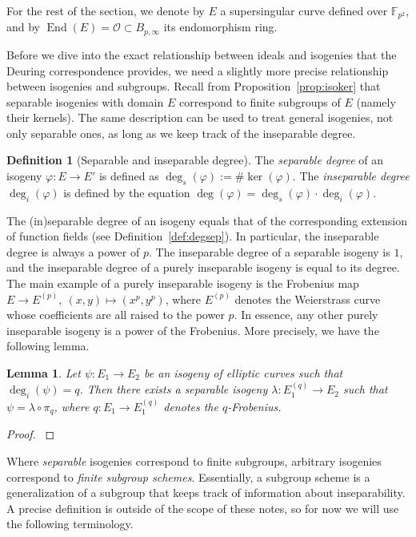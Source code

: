 \documentclass[10pt]{article}
\theoremstyle{plain}
\newtheorem{lemma}[theorem]{Lemma}
\theoremstyle{definition}
\newtheorem{definition}[theorem]{Definition}
\DeclareMathOperator{\End}{End} %
\def\F{\ensuremath{\mathbb{F}}}
\def\O{\ensuremath{\mathcal{O}}}
\begin{document}
For the rest of the section, we denote by $E$ a supersingular curve
defined over $\F_{p^2}$, and by $\End(E)=\O\subset B_{p,\infty}$ its
endomorphism ring.

Before we dive into the exact relationship between ideals and isogenies
that the Deuring correspondence provides, we need a slightly more
precise relationship between isogenies and subgroups.
Recall from Proposition~\ref{prop:isoker} that separable isogenies
with domain $E$ correspond to finite subgroups of $E$ (namely their kernels).
The same description can be used to treat general isogenies, not only
separable ones, as long as we keep track of the inseparable degree.

\begin{definition}[Separable and inseparable degree]
The \emph{separable degree} of an isogeny $\varphi:E\to E'$ is defined as
$\deg_s(\varphi):= \#\ker(\varphi)$.
The \emph{inseparable degree} $\deg_i(\varphi)$ is defined
by the equation
$\deg(\varphi) = \deg_s(\varphi) \cdot \deg_i(\varphi)$.
\end{definition}

The (in)separable degree of an isogeny equals that of 
the corresponding extension of function fields
(see Definition~\ref{def:degsep}).
In particular, the inseparable degree is always a power of $p$.
The inseparable degree of a separable isogeny is $1$,
and the inseparable degree of a purely inseparable isogeny is equal
to its degree.
The main example of a purely inseparable isogeny is the Frobenius map
$E\to E^{(p)},\:(x,y)\mapsto (x^p,y^p)$, where $E^{(p)}$ denotes the
Weierstrass curve whose coefficients are all raised to the power $p$.
In essence, any other purely inseparable isogeny is a power of the
Frobenius. More precisely, we have the following lemma.

\begin{lemma}\label{lem:insepdecomp}
    Let $\psi:E_1\to E_2$ be an isogeny of elliptic curves such that
    $\deg_i(\psi)=q$. Then there exists a separable isogeny
    $\lambda:E_1^{(q)}\to E_2$ such that $\psi = \lambda\circ\pi_q$,
    where $q:E_1 \to E_1^{(q)}$ denotes the $q$-Frobenius.
\end{lemma}
\begin{proof}
    \cite[II, Coro.~2.12]{silverman:elliptic}
\end{proof}

Where \emph{separable} isogenies correspond to finite subgroups,
arbitrary isogenies correspond to \emph{finite subgroup schemes}.
Essentially, a subgroup scheme is a generalization of a subgroup that
keeps track of information about inseparability.
A precise definition is outside of the scope of these notes, so for
now we will use the following terminology.
\end{document}
